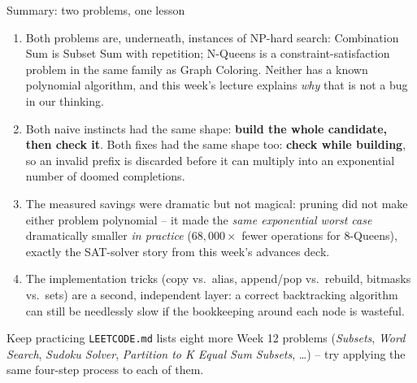 \documentclass[11pt,aspectratio=169]{beamer}
\begin{document}
\begin{frame}{Summary: two problems, one lesson}
  \footnotesize
  \begin{enumerate}
    \item Both problems are, underneath, instances of NP-hard search: Combination Sum
    is Subset Sum with repetition; N-Queens is a constraint-satisfaction problem in the
    same family as Graph Coloring. Neither has a known polynomial algorithm, and this
    week's lecture explains \emph{why} that is not a bug in our thinking.
    \item Both naive instincts had the same shape: \textbf{build the whole candidate,
    then check it}. Both fixes had the same shape too: \textbf{check while building},
    so an invalid prefix is discarded before it can multiply into an exponential
    number of doomed completions.
    \item The measured savings were dramatic but not magical: pruning did not make
    either problem polynomial -- it made the \emph{same exponential worst case}
    dramatically smaller \emph{in practice} ($68{,}000\times$ fewer operations for
    8-Queens), exactly the SAT-solver story from this week's advances deck.
    \item The implementation tricks (copy vs.\ alias, append/pop vs.\ rebuild, bitmasks
    vs.\ sets) are a second, independent layer: a correct backtracking algorithm can
    still be needlessly slow if the bookkeeping around each node is wasteful.
  \end{enumerate}
  \begin{alertblock}{Keep practicing}
    \texttt{LEETCODE.md} lists eight more Week 12 problems (\emph{Subsets},
    \emph{Word Search}, \emph{Sudoku Solver}, \emph{Partition to K Equal Sum Subsets},
    \dots) -- try applying the same four-step process to each of them.
  \end{alertblock}
\end{frame}
\end{document}
